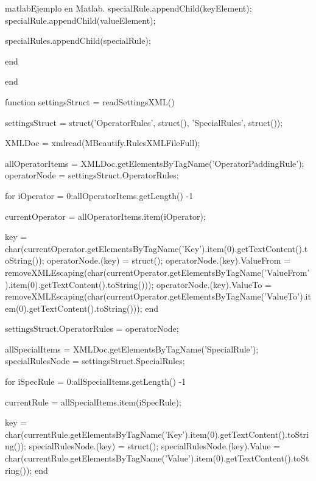 \begin{sourcecode}{matlab}{Ejemplo en Matlab.}
                specialRule.appendChild(keyElement);
                specialRule.appendChild(valueElement);
                
                specialRules.appendChild(specialRule);
                
            end
            
        end
        
        function settingsStruct = readSettingsXML()
            
            settingsStruct = struct('OperatorRules', struct(), 'SpecialRules', struct());
            
            XMLDoc = xmlread(MBeautify.RulesXMLFileFull);
            
            allOperatorItems = XMLDoc.getElementsByTagName('OperatorPaddingRule');
            operatorNode = settingsStruct.OperatorRules;
            
            for iOperator = 0:allOperatorItems.getLength() -1
                
                currentOperator = allOperatorItems.item(iOperator);
                
                key = char(currentOperator.getElementsByTagName('Key').item(0).getTextContent().toString());
                operatorNode.(key) = struct();
                operatorNode.(key).ValueFrom = removeXMLEscaping(char(currentOperator.getElementsByTagName('ValueFrom').item(0).getTextContent().toString()));
                operatorNode.(key).ValueTo = removeXMLEscaping(char(currentOperator.getElementsByTagName('ValueTo').item(0).getTextContent().toString()));
            end
            
            settingsStruct.OperatorRules = operatorNode;
            
            allSpecialItems = XMLDoc.getElementsByTagName('SpecialRule');
            specialRulesNode = settingsStruct.SpecialRules;
            
            for iSpecRule = 0:allSpecialItems.getLength() -1
                
                currentRule = allSpecialItems.item(iSpecRule);
                
                key = char(currentRule.getElementsByTagName('Key').item(0).getTextContent().toString());
                specialRulesNode.(key) = struct();
                specialRulesNode.(key).Value = char(currentRule.getElementsByTagName('Value').item(0).getTextContent().toString());
            end
            

\end{sourcecode}
